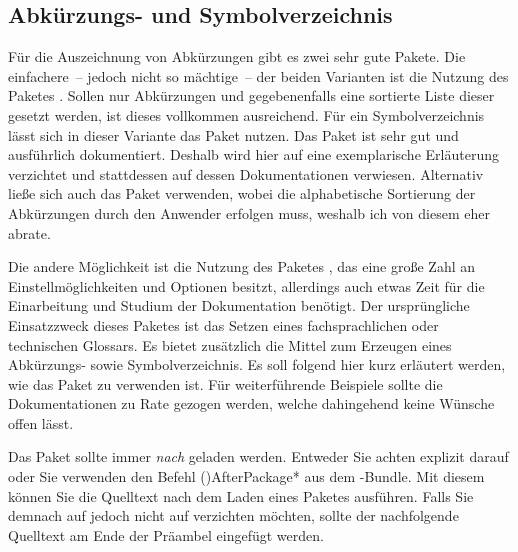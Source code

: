 \documentclass[%
  english,ngerman,%
  cdgeometry=no,DIV=12,%
  cd=false,cdfont=false,cdtitle=true,%
  headings=normal,%
  automark,%
  listof=toc,%
]{tudscrartcl}
\begin{document}
\subsection{%
  Abkürzungs- und Symbolverzeichnis%
  \label{sec:glossaries}%
}

Für die Auszeichnung von Abkürzungen gibt es zwei sehr gute Pakete. Die 
einfachere~-- jedoch nicht so mächtige~-- der beiden Varianten ist die Nutzung 
des Paketes . Sollen nur Abkürzungen und gegebenenfalls eine 
sortierte Liste dieser gesetzt werden, ist dieses vollkommen ausreichend. Für 
ein Symbolverzeichnis lässt sich in dieser Variante das Paket  
nutzen. Das Paket  ist sehr gut und ausführlich dokumentiert. 
Deshalb wird hier auf eine exemplarische Erläuterung verzichtet und stattdessen 
auf dessen Dokumentationen verwiesen. Alternativ ließe sich auch das Paket 
 verwenden, wobei die alphabetische Sortierung der Abkürzungen 
durch den Anwender erfolgen muss, weshalb ich von diesem eher abrate.

Die andere Möglichkeit ist die Nutzung des Paketes , das 
eine große Zahl an Einstellmöglichkeiten und Optionen besitzt, allerdings auch 
etwas Zeit für die Einarbeitung und Studium der Dokumentation benötigt. Der 
ursprüngliche Einsatzzweck dieses Paketes ist das Setzen eines fachsprachlichen 
oder technischen Glossars. Es bietet zusätzlich die Mittel zum Erzeugen eines 
Abkürzungs- sowie Symbolverzeichnis. Es soll folgend hier kurz erläutert 
werden, wie das Paket zu verwenden ist. Für weiterführende Beispiele sollte 
die Dokumentationen zu Rate gezogen werden, welche dahingehend keine Wünsche 
offen lässt. 

Das Paket  sollte immer \emph{nach}  
geladen werden. Entweder Sie achten explizit darauf oder Sie verwenden den 
Befehl \Macro(){AfterPackage*} aus dem \KOMAScript-Bundle. Mit 
diesem können Sie die Quelltext nach dem Laden eines Paketes ausführen. 
Falls Sie demnach auf  jedoch nicht auf  
verzichten möchten, sollte der nachfolgende Quelltext am Ende der Präambel 
eingefügt werden.
\end{document}
